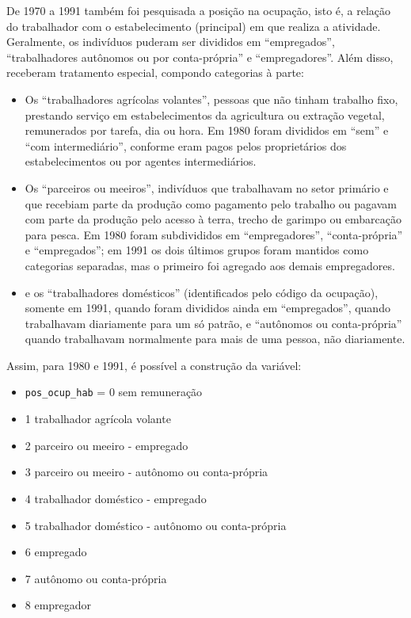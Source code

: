 \documentclass[12pt,a4paper]{article}
\newcommand{\vr}[1]{\texttt{#1}}
\begin{document}
De 1970 a 1991 também foi pesquisada a posição na ocupação, isto é, a relação do trabalhador com o estabelecimento (principal) em que realiza a atividade. Geralmente, os indivíduos puderam ser divididos em “empregados”, “trabalhadores autônomos ou por conta-própria” e “empregadores”. Além disso, receberam tratamento especial, compondo categorias à parte:
\begin{itemize}
  \item Os “trabalhadores agrícolas volantes”, pessoas que não tinham trabalho fixo, prestando serviço em estabelecimentos da agricultura ou extração vegetal, remunerados por tarefa, dia ou hora. Em 1980 foram divididos em “sem” e “com intermediário”, conforme eram pagos pelos proprietários dos estabelecimentos ou por agentes intermediários.
  \item Os “parceiros ou meeiros”, indivíduos que trabalhavam no setor primário e que recebiam parte da produção como pagamento pelo trabalho ou pagavam com parte da produção pelo acesso à terra, trecho de garimpo ou embarcação para pesca. Em 1980 foram subdivididos em “empregadores”, “conta-própria” e “empregados”; em 1991 os dois últimos grupos foram mantidos como categorias separadas, mas o primeiro foi agregado aos demais empregadores.
  \item e os “trabalhadores domésticos” (identificados pelo código da ocupação), somente em 1991, quando foram divididos ainda em “empregados”, quando trabalhavam diariamente para um só patrão, e “autônomos ou conta-própria” quando trabalhavam normalmente para mais de uma pessoa, não diariamente.
\end{itemize}

Assim, para 1980 e 1991, é possível a construção da variável:
\begin{itemize}
  \item \vr{pos\_ocup\_hab} = 0 sem remuneração
  \item 1 trabalhador agrícola volante
  \item 2 parceiro ou meeiro - empregado
  \item 3 parceiro ou meeiro - autônomo ou conta-própria
  \item 4 trabalhador doméstico - empregado
  \item 5 trabalhador doméstico - autônomo ou conta-própria
  \item 6 empregado
  \item 7 autônomo ou conta-própria
  \item 8 empregador
\end{itemize}
\end{document}
